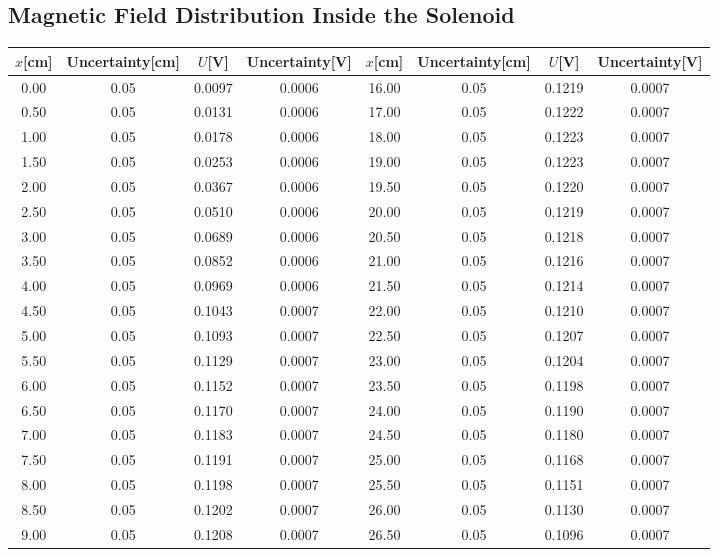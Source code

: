 \documentclass[a4paper]{article}
\begin{document}
    \subsection{Magnetic Field Distribution Inside the Solenoid}\label{sec:3}
    \begin{table}[H]
        \centering
        \begin{tabular}{|c|c|c|c||c|c|c|c|}
            \hline
            $x$[cm]&Uncertainty[cm]&$U$[V]&Uncertainty[V]&$x$[cm]&Uncertainty[cm]&$U$[V]&Uncertainty[V]\\\hline
            0.00&0.05&0.0097&0.0006&16.00&0.05&0.1219&0.0007\\\hline
            0.50&0.05&0.0131&0.0006&17.00&0.05&0.1222&0.0007\\\hline
            1.00&0.05&0.0178&0.0006&18.00&0.05&0.1223&0.0007\\\hline
            1.50&0.05&0.0253&0.0006&19.00&0.05&0.1223&0.0007\\\hline
            2.00&0.05&0.0367&0.0006&19.50&0.05&0.1220&0.0007\\\hline
            2.50&0.05&0.0510&0.0006&20.00&0.05&0.1219&0.0007\\\hline
            3.00&0.05&0.0689&0.0006&20.50&0.05&0.1218&0.0007\\\hline
            3.50&0.05&0.0852&0.0006&21.00&0.05&0.1216&0.0007\\\hline
            4.00&0.05&0.0969&0.0006&21.50&0.05&0.1214&0.0007\\\hline
            4.50&0.05&0.1043&0.0007&22.00&0.05&0.1210&0.0007\\\hline
            5.00&0.05&0.1093&0.0007&22.50&0.05&0.1207&0.0007\\\hline
            5.50&0.05&0.1129&0.0007&23.00&0.05&0.1204&0.0007\\\hline
            6.00&0.05&0.1152&0.0007&23.50&0.05&0.1198&0.0007\\\hline
            6.50&0.05&0.1170&0.0007&24.00&0.05&0.1190&0.0007\\\hline
            7.00&0.05&0.1183&0.0007&24.50&0.05&0.1180&0.0007\\\hline
            7.50&0.05&0.1191&0.0007&25.00&0.05&0.1168&0.0007\\\hline
            8.00&0.05&0.1198&0.0007&25.50&0.05&0.1151&0.0007\\\hline
            8.50&0.05&0.1202&0.0007&26.00&0.05&0.1130&0.0007\\\hline
            9.00&0.05&0.1208&0.0007&26.50&0.05&0.1096&0.0007\\\hline

\end{tabular}
\end{table}
\end{document}
